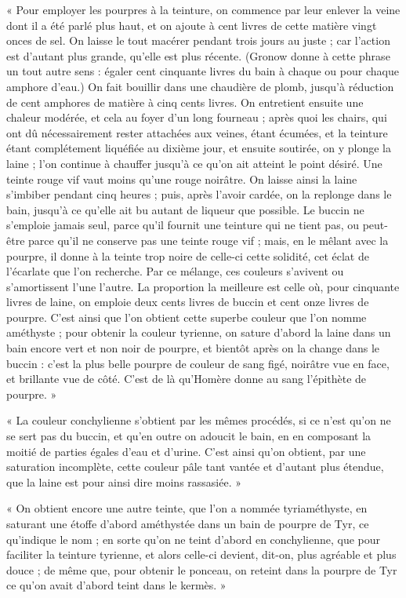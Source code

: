 \documentclass[a4paper, 11pt, oneside, polutonikogreek, french]{article}
\begin{document}
« Pour employer les pourpres à la teinture, on commence par leur enlever la veine dont il a été parlé plus haut, et on ajoute à cent livres de cette matière vingt onces de sel. On laisse le tout macérer pendant trois jours au juste ; car l'action est d'autant plus grande, qu'elle est plus récente. (Gronow donne à cette phrase un tout autre sens : égaler cent cinquante livres du bain à chaque ou pour chaque amphore d'eau.) On fait bouillir dans une chaudière de plomb, jusqu'à réduction de cent amphores de matière à cinq cents livres. On entretient ensuite une chaleur modérée, et cela au foyer d'un long fourneau ; après quoi les chairs, qui ont dû nécessairement rester attachées aux veines, étant écumées, et la teinture étant complétement liquéfiée au dixième jour, et ensuite soutirée, on y plonge la laine ; l'on continue à chauffer jusqu'à ce qu'on ait atteint le point désiré. Une teinte rouge vif vaut moins qu'une rouge noirâtre. On laisse ainsi la laine s'imbiber pendant cinq heures ; puis, après l'avoir cardée, on la replonge dans le bain, jusqu'à ce qu'elle ait bu autant de liqueur que possible. Le buccin ne s'emploie jamais seul, parce qu'il fournit une teinture qui ne tient pas, ou peut-être parce qu'il ne conserve pas une teinte rouge vif ; mais, en le mêlant avec la pourpre, il donne à la teinte trop noire de celle-ci cette solidité, cet éclat de l'écarlate que l'on recherche. Par ce mélange, ces couleurs s'avivent ou s'amortissent l'une l'autre. La proportion la meilleure est celle où, pour cinquante livres de laine, on emploie deux cents livres de buccin et cent onze livres de pourpre. C'est ainsi que l'on obtient cette superbe couleur que l'on nomme améthyste ; pour obtenir la couleur tyrienne, on sature d'abord la laine dans un bain encore vert et non noir de pourpre, et bientôt après on la change dans le buccin : c'est la plus belle pourpre de couleur de sang figé, noirâtre vue en face, et brillante vue de côté. C'est de là qu'Homère donne au sang l'épithète de pourpre. »

« La couleur conchylienne s'obtient par les mêmes procédés, si ce n'est qu'on ne se sert pas du buccin, et qu'en outre on adoucit le bain, en en composant la moitié de parties égales d'eau et d'urine. C'est ainsi qu'on obtient, par une saturation incomplète, cette couleur pâle tant vantée et d'autant plus étendue, que la laine est pour ainsi dire moins rassasiée. »

« On obtient encore une autre teinte, que l'on a nommée tyriaméthyste, en saturant une étoffe d'abord améthystée dans un bain de pourpre de Tyr, ce qu'indique le nom ; en sorte qu'on ne teint d'abord en conchylienne, que pour faciliter la teinture tyrienne, et alors celle-ci devient, dit-on, plus agréable et plus douce ; de même que, pour obtenir le ponceau, on reteint dans la pourpre de Tyr ce qu'on avait d'abord teint dans le kermès. »
\end{document}
